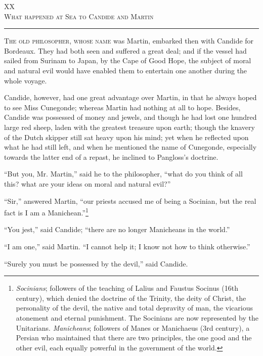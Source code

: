 \begin{center}
XX\\
\textsc{What happened at Sea to Candide and Martin}
\end{center}
\vspace{-0.5cm}
\rule{\textwidth}{0.5pt}
\lettrine{T}{he old philosopher, whose name} was Martin, embarked then with Candide for Bordeaux. They had both seen and suffered a great deal; and if the vessel had sailed from Surinam to Japan, by the Cape of Good Hope, the subject of moral and natural evil would have enabled them to entertain one another during the whole voyage.

Candide, however, had one great advantage over Martin, in that he always hoped to see Miss Cunegonde; whereas Martin had nothing at all to hope. Besides, Candide was possessed of money and jewels, and though he had lost one hundred large red sheep, laden with the greatest treasure upon earth; though the knavery of the Dutch skipper still sat heavy upon his mind; yet when he reflected upon what he had still left, and when he mentioned the name of Cunegonde, especially towards the latter end of a repast, he inclined to Pangloss's doctrine.

``But you, Mr. Martin,'' said he to the philosopher, ``what do you think of all this? what are your ideas on moral and natural evil?''

``Sir,'' answered Martin, ``our priests accused me of being a Socinian, but the real fact is I am a Manichean.''\footnote{\textit{Socinians}; followers of the teaching of Lalius and Faustus Socinus (16th century), which denied the doctrine of the Trinity, the deity of Christ, the personality of the devil, the native and total depravity of man, the vicarious atonement and eternal punishment. The Socinians are now represented by the Unitarians. \textit{Manicheans}; followers of Manes or Manichaeus (3rd century), a Persian who maintained that there are two principles, the one good and the other evil, each equally powerful in the government of the world.}

``You jest,'' said Candide; ``there are no longer Manicheans in the world.''

``I am one,'' said Martin. ``I cannot help it; I know not how to think otherwise.''

``Surely you must be possessed by the devil,'' said Candide.

